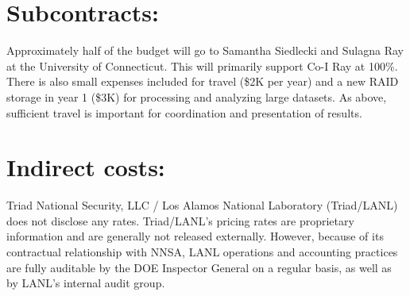 \section*{Subcontracts:}
Approximately half of the budget will go to Samantha Siedlecki and Sulagna Ray at the University of Connecticut.  This will primarily support Co-I Ray at 100\%.  There is also small expenses included for travel (\$2K per year) and a new RAID storage in year 1 (\$3K) for processing and analyzing large datasets.  As above, sufficient travel is important for coordination and presentation of results.

\section*{Indirect costs:}
Triad National Security, LLC / Los Alamos National Laboratory (Triad/LANL) does not disclose any rates. Triad/LANL’s pricing rates are proprietary information and are generally not released externally. However, because of its contractual relationship with NNSA, LANL operations and accounting practices are fully auditable by the DOE Inspector General on a regular basis, as well as by LANL’s internal audit group.

